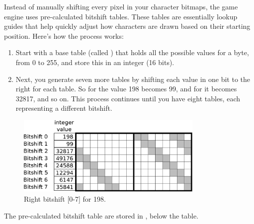 \documentclass[book.tex]{subfiles}
\begin{document}
\par
Instead of manually shifting every pixel in your character bitmaps, the game engine uses pre-calculated bitshift tables. These tables are essentially lookup guides that help quickly adjust how characters are drawn based on their starting position. Here's how the process works:
\begin{enumerate}
  \item Start with a base table (called ) that holds all the possible values for a byte, from 0 to 255, and store this in an integer (16 bits). 
  \item Next, you generate seven more tables by shifting each value in  one bit to the right for each table. So for  the value 198 becomes 99, and for  it becomes 32817, and so on. This process continues until you have eight tables, each representing a different bitshift.
\end{enumerate}

\begin{figure}[H]
\centering
 \includegraphics[width=0.8\textwidth]{imgs/drawings/shift_tables.eps}
 \caption{Right bitshift [0-7] for 198.}
 \label{fig:shiftttable}
 \end{figure}

\par
The pre-calculated bitshift table are stored in , below the  table.\\

\begin{minipage}{\textwidth}
  
\end{minipage}
\label{wallclip_array}
\end{document}
